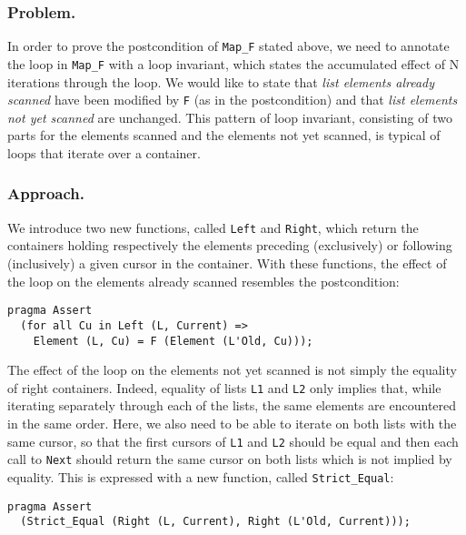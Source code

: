 \documentclass[runningheads,a4paper]{llncs}
\begin{document}
\subsubsection{Problem.}

In order to prove the postcondition of \verb|Map_F| stated above, we need to
annotate the loop in \verb|Map_F| with a loop invariant, which states the
accumulated effect of N iterations through the loop. We would like to state
that \emph{list elements already scanned} have been modified by \verb|F| (as in
the postcondition) and that \emph{list elements not yet scanned} are
unchanged. This pattern of loop invariant, consisting of two parts for the
elements scanned and the elements not yet scanned, is typical of loops that
iterate over a container.

\subsubsection{Approach.}

We introduce two new functions, called \verb|Left| and \verb|Right|, which
return the containers holding respectively the elements preceding (exclusively) or
following (inclusively) a given cursor in the container. With these functions, the effect of
the loop on the elements already scanned resembles the postcondition:
\begin{lstlisting}
pragma Assert
  (for all Cu in Left (L, Current) =>
    Element (L, Cu) = F (Element (L'Old, Cu)));
\end{lstlisting}
The effect of the loop on the elements not yet scanned is not simply the
equality of right containers. Indeed, equality of lists \verb|L1| and \verb|L2|
only implies that, while iterating separately through each of the lists, the
same elements are encountered in the same order. Here, we also need to be able
to iterate on both lists with the same cursor, so that the first cursors of
\verb|L1| and \verb|L2| should be equal and then each call to \verb|Next|
should return the same cursor on both lists
which is not implied by equality.
This is expressed with a new
function, called \verb|Strict_Equal|:
\begin{lstlisting}
pragma Assert
  (Strict_Equal (Right (L, Current), Right (L'Old, Current)));
\end{lstlisting}
\end{document}
